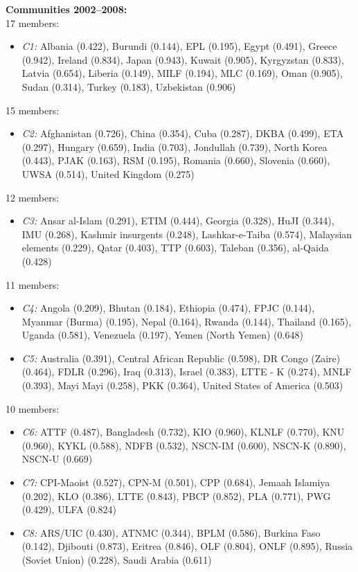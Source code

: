 \textbf{Communities 2002--2008:}\\
17 members:
\begin{itemize}[noitemsep, topsep=0pt]
    \item \textit{C1:} Albania (0.422), Burundi (0.144), EPL (0.195), Egypt (0.491), Greece (0.942), Ireland (0.834), Japan (0.943), Kuwait (0.905), Kyrgyzstan (0.833), Latvia (0.654), Liberia (0.149), MILF (0.194), MLC (0.169), Oman (0.905), Sudan (0.314), Turkey (0.183), Uzbekistan (0.906)
\end{itemize}
15 members:
\begin{itemize}[noitemsep, topsep=0pt]
    \item \textit{C2:} Afghanistan (0.726), China (0.354), Cuba (0.287), DKBA (0.499), ETA (0.297), Hungary (0.659), India (0.703), Jondullah (0.739), North Korea (0.443), PJAK (0.163), RSM (0.195), Romania (0.660), Slovenia (0.660), UWSA (0.514), United Kingdom (0.275)
\end{itemize}
12 members:
\begin{itemize}[noitemsep, topsep=0pt]
    \item \textit{C3:} Ansar al-Islam (0.291), ETIM (0.444), Georgia (0.328), HuJI (0.344), IMU (0.268), Kashmir insurgents (0.248), Lashkar-e-Taiba (0.574), Malaysian elements (0.229), Qatar (0.403), TTP (0.603), Taleban (0.356), al-Qaida (0.428)
\end{itemize}
11 members:
\begin{itemize}[noitemsep, topsep=0pt]
    \item \textit{C4:} Angola (0.209), Bhutan (0.184), Ethiopia (0.474), FPJC (0.144), Myanmar (Burma) (0.195), Nepal (0.164), Rwanda (0.144), Thailand (0.165), Uganda (0.581), Venezuela (0.197), Yemen (North Yemen) (0.648)
    \item \textit{C5:} Australia (0.391), Central African Republic (0.598), DR Congo (Zaire) (0.464), FDLR (0.296), Iraq (0.313), Israel (0.383), LTTE - K (0.274), MNLF (0.393), Mayi Mayi (0.258), PKK (0.364), United States of America (0.503)
\end{itemize}
10 members:
\begin{itemize}[noitemsep, topsep=0pt]
    \item \textit{C6:} ATTF (0.487), Bangladesh (0.732), KIO (0.960), KLNLF (0.770), KNU (0.960), KYKL (0.588), NDFB (0.532), NSCN-IM (0.600), NSCN-K (0.890), NSCN-U (0.669)
    \item \textit{C7:} CPI-Maoist (0.527), CPN-M (0.501), CPP (0.684), Jemaah Islamiya (0.202), KLO (0.386), LTTE (0.843), PBCP (0.852), PLA (0.771), PWG (0.429), ULFA (0.824)
    \item \textit{C8:} ARS/UIC (0.430), ATNMC (0.344), BPLM (0.586), Burkina Faso (0.142), Djibouti (0.873), Eritrea (0.846), OLF (0.804), ONLF (0.895), Russia (Soviet Union) (0.228), Saudi Arabia (0.611)
\end{itemize}
